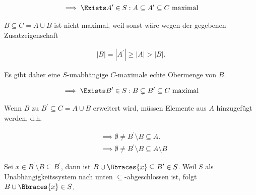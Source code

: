 \begin{solution}
\begin{enumerate}[label = \arabic*.]
    \begin{align*}
        \implies
        \Exists A^\prime \in S:
        A \subseteq A^\prime \subseteq C ~\text{maximal}
    \end{align*}

    $B \subseteq C = A \cup B$ ist nicht maximal, weil sonst wäre wegen der gegebenen Zusatzeigenschaft

    \begin{align*}
        |B| = |A^\prime| \geq |A| > |B|.
    \end{align*}

    Es gibt daher eine $S$-unabhängige $C$-maximale echte Obermenge von $B$.

    \begin{align*}
        \implies
        \Exists B^\prime \in S:
        B \subsetneq B^\prime \subseteq C ~\text{maximal}
    \end{align*}

    Wenn $B$ zu $B^\prime \subseteq C = A \cup B$ erweitert wird, müssen Elemente aus $A$ hinzugefügt werden, d.h.

    \begin{align*}
        & \implies
        \emptyset \neq B^\prime \setminus B \subseteq A. \\
        & \implies
        \emptyset \neq B^\prime \setminus B \subseteq A \setminus B
    \end{align*}

    Sei $x \in B^\prime \setminus B \subseteq B^\prime$, dann ist $B \cup \Bbraces{x} \subseteq B^\prime \in S$.
    Weil $S$ als Unabhängigkeitssystem nach unten $\subseteq$-abgeschlossen ist, folgt $B \cup \Bbraces{x} \in S$.

\end{enumerate}

\end{solution}

